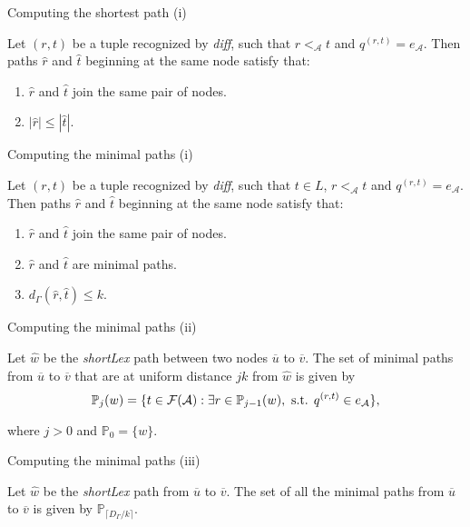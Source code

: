 \begin{frame}{Computing the shortest path (i)}

Let $(r,t)$ be a tuple recognized by \textit{diff}, such that $r<_\mathcal{A} t$ and $q^{(r,t)}=e_\mathcal{A}$. Then paths $\widehat{r}$ and $\widehat{t}$ beginning at the same node satisfy that:
\begin{enumerate}
    \item $\widehat{r}$ and $\widehat{t}$ join the same pair of nodes.
    \item $|\widehat{r}|\leq|\widehat{t}|$.
\end{enumerate}
\end{frame}


\begin{frame}{Computing the minimal paths (i)}

Let $(r,t)$ be a tuple recognized by \textit{diff}, such that $t\in L$, $r<_\mathcal{A}t$ and $q^{(r,t)}=e_\mathcal{A}$. Then paths $\widehat{r}$ and $\widehat{t}$ beginning at the same node satisfy that:
\begin{enumerate}
    \item $\widehat{r}$ and $\widehat{t}$ join the same pair of nodes.
    \item $\widehat{r}$ and $\widehat{t}$ are minimal paths.
    \item $d_\Gamma(\widehat{r},\widehat{t})\leq k$.
\end{enumerate}
\end{frame}

\begin{frame}{Computing the minimal paths (ii)}

\begin{lemma}
Let $\widehat{w}$ be the \textit{shortLex} path between two nodes $\overline{u}$ to $\overline{v}$. The set of minimal paths from $\overline{u}$ to $\overline{v}$ that are at uniform distance $jk$ from $\widehat{w}$ is given by
$$\mathbb{P}_{j}(w) =\{t\in \mathcal{F}(\mathcal{A}):\exists r \in \mathbb{P}_{j-1}(w),\textnormal{ s.t. } q^{(r,t)}\in e_\mathcal{A}\},$$

where $j>0$ and $\mathbb{P}_0=\{w\}$.
\end{lemma}

\end{frame}

\begin{frame}{Computing the minimal paths (iii)}

\begin{corollary}
Let $\widehat{w}$ be the \textit{shortLex} path from $\overline{u}$ to $\overline{v}$. The set of all the minimal paths from $\overline{u}$ to $\overline{v}$ is given by $\mathbb{P}_{\lceil D_\Gamma / k\rceil}$.
\end{corollary}

\end{frame}

